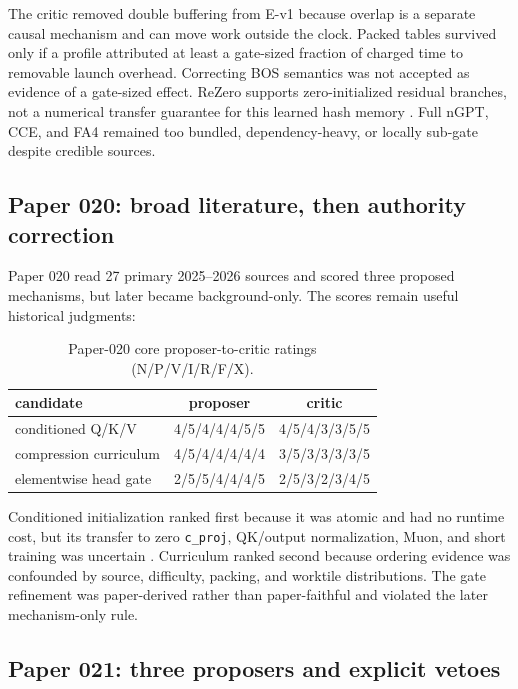 \documentclass{article}
\begin{document}
The critic removed double buffering from E-v1 because overlap is a separate
causal mechanism and can move work outside the clock.  Packed tables survived
only if a profile attributed at least a gate-sized fraction of charged time
to removable launch overhead.  Correcting BOS semantics was not accepted as
evidence of a gate-sized effect.  ReZero supports zero-initialized residual
branches, not a numerical transfer guarantee for this learned hash memory
\cite{bachlechner2020rezero}.  Full nGPT, CCE, and FA4 remained too bundled,
dependency-heavy, or locally sub-gate despite credible sources.

\subsection{Paper 020: broad literature, then authority correction}

Paper 020 read 27 primary 2025--2026 sources and scored three proposed
mechanisms, but later became background-only.  The scores remain useful
historical judgments:
\begin{table}[t]
\caption{Paper-020 core proposer-to-critic ratings
(N/P/V/I/R/F/X).}
\label{tab:p020core}
\centering\scriptsize
\begin{tabular}{lcc}
\toprule
candidate & proposer & critic\\
\midrule
conditioned Q/K/V & 4/5/4/4/4/5/5 & 4/5/4/3/3/5/5\\
compression curriculum & 4/5/4/4/4/4/4 & 3/5/3/3/3/3/5\\
elementwise head gate & 2/5/5/4/4/4/5 & 2/5/3/2/3/4/5\\
\bottomrule
\end{tabular}
\end{table}

Conditioned initialization ranked first because it was atomic and had no
runtime cost, but its transfer to zero \texttt{c\_proj}, QK/output
normalization, Muon, and short training was uncertain
\cite{saratchandran2026conditioned}.  Curriculum ranked second because
ordering evidence was confounded by source, difficulty, packing, and worktile
distributions.  The gate refinement was paper-derived rather than
paper-faithful and violated the later mechanism-only rule.

\subsection{Paper 021: three proposers and explicit vetoes}
\end{document}
